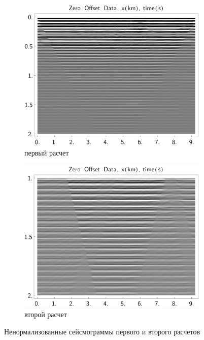 \documentclass{article}
\begin{document}
\begin{figure}[tb]
\centering
\begin{subfigure}{.3333\textwidth}\includegraphics[width=\textwidth]{pic/report_april/zo_seism_toobad}\caption{первый расчет}\end{subfigure}\hspace{.1111\textwidth}
\begin{subfigure}{.3333\textwidth}\includegraphics[width=\textwidth]{pic/report_april/zo_seism_bad}\caption{второй расчет}\end{subfigure}%
\caption{Ненормализованные сейсмограммы первого и второго расчетов} \label{marmresult12}
\end{figure}
\end{document}
